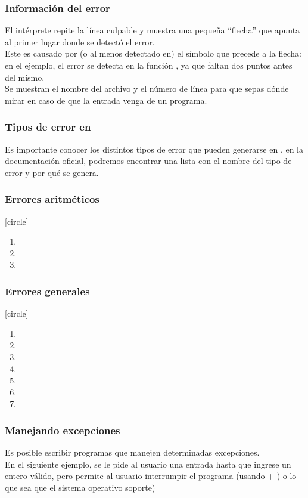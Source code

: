 \begin{frame}
\frametitle{Información del error}
\fontsize{13}{13}\selectfont
El intérprete repite la línea culpable y muestra una pequeña \enquote{flecha} que apunta al primer lugar donde se detectó el error.
\\
\bigskip
Este es causado por (o al menos detectado en) el símbolo que precede a la flecha: en el ejemplo, el error se detecta en la función , ya que faltan dos puntos \azulfuerte{(:)} antes del mismo.
\\
\bigskip
Se muestran el nombre del archivo y el número de línea para que sepas dónde mirar en caso de que la entrada venga de un programa.    
\end{frame}
\begin{frame}
\frametitle{Tipos de error en \python}
Es importante conocer los distintos tipos de error que pueden generarse en \python, en la documentación oficial, podremos encontrar una lista con el nombre del tipo de error y por qué se genera.
\end{frame}
\begin{frame}
\frametitle{Errores aritméticos}
[circle]
\begin{enumerate}[<+->]
\item {}
\item {}
\item {}
\end{enumerate}
\end{frame}
\begin{frame}
\frametitle{Errores generales}
[circle]
\begin{enumerate}[<+->]
\item {}
\item {}
\item {}
\item {}
\item {}
\item {}
\item {}
\end{enumerate}
\end{frame}
\begin{frame}[fragile]
\frametitle{Manejando excepciones}
Es posible escribir programas que manejen determinadas excepciones. 
\\
\bigskip
En el siguiente ejemplo, se le pide al usuario una entrada hasta que ingrese un entero válido, pero permite al usuario interrumpir el programa (usando \keys{\ctrl} + ) o lo que sea que el sistema operativo soporte)
\end{frame}

